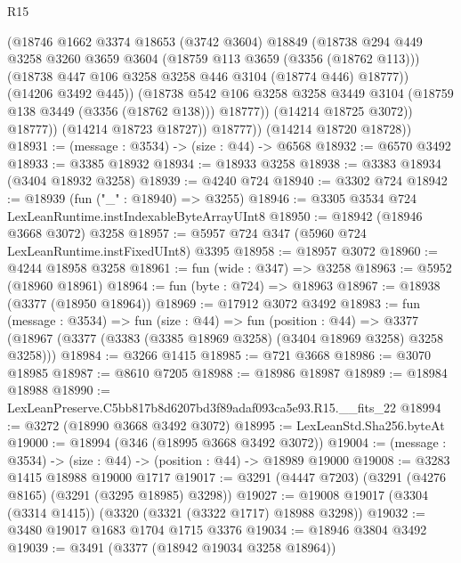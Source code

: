 \begin{lexlean}{R15}
\begin{coremodule}
                    (@18746
                      @1662
                      @3374
                      @18653
                      (@3742 @3604)
                      @18849
                      (@18738
                        @294
                        @449
                        @3258
                        @3260
                        @3659
                        @3604
                        (@18759 @113 @3659 (@3356 (@18762 @113)))
                        (@18738 @447 @106 @3258 @3258 @446 @3104 (@18774 @446) @18777))
                      (@14206 @3492 @445))
                    (@18738
                      @542
                      @106
                      @3258
                      @3258
                      @3449
                      @3104
                      (@18759 @138 @3449 (@3356 (@18762 @138)))
                      @18777))
                  (@14214 @18725 @3072))
                @18777))
            (@14214 @18723 @18727))
          @18777))
      (@14214 @18720 @18728))
@18931 := (message : @3534) -> (size : @44) -> @6568
@18932 := @6570 @3492
@18933 := @3385 @18932
@18934 := @18933 @3258
@18938 := @3383 @18934 (@3404 @18932 @3258)
@18939 := @4240 @724
@18940 := @3302 @724
@18942 := @18939 (fun ("_" : @18940) => @3255)
@18946 := @3305 @3534 @724 LexLeanRuntime.instIndexableByteArrayUInt8
@18950 := @18942 (@18946 @3668 @3072) @3258
@18957 := @5957 @724 @347 (@5960 @724 LexLeanRuntime.instFixedUInt8) @3395
@18958 := @18957 @3072
@18960 := @4244 @18958 @3258
@18961 := fun (wide : @347) => @3258
@18963 := @5952 (@18960 @18961)
@18964 := fun (byte : @724) => @18963
@18967 := @18938 (@3377 (@18950 @18964))
@18969 := @17912 @3072 @3492
@18983 := fun (message : @3534) =>
  fun (size : @44) =>
  fun (position : @44) =>
  @3377 (@18967 (@3377 (@3383 (@3385 @18969 @3258) (@3404 @18969 @3258) @3258 @3258)))
@18984 := @3266 @1415
@18985 := @721 @3668
@18986 := @3070 @18985
@18987 := @8610 @7205
@18988 := @18986 @18987
@18989 := @18984 @18988
@18990 := LexLeanPreserve.C5bb817b8d6207bd3f89adaf093ca5e93.R15.__fits_22
@18994 := @3272 (@18990 @3668 @3492 @3072)
@18995 := LexLeanStd.Sha256.byteAt
@19000 := @18994 (@346 (@18995 @3668 @3492 @3072))
@19004 := (message : @3534) -> (size : @44) -> (position : @44) -> @18989 @19000
@19008 := @3283 @1415 @18988 @19000 @1717
@19017 := @3291 (@4447 @7203) (@3291 (@4276 @8165) (@3291 (@3295 @18985) @3298))
@19027 := @19008 @19017 (@3304 (@3314 @1415)) (@3320 (@3321 (@3322 @1717) @18988 @3298))
@19032 := @3480 @19017 @1683 @1704 @1715 @3376
@19034 := @18946 @3804 @3492
@19039 := @3491 (@3377 (@18942 @19034 @3258 @18964))

\end{coremodule}
\end{lexlean}
